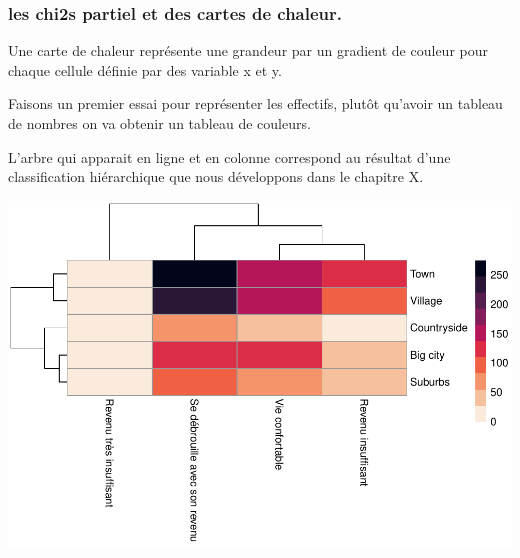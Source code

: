 \documentclass[
]{book}
\newenvironment{Shaded}{\begin{snugshade}}{\end{snugshade}}
\newcommand{\DataTypeTok}[1]{\textcolor[rgb]{0.13,0.29,0.53}{#1}}
\newcommand{\DecValTok}[1]{\textcolor[rgb]{0.00,0.00,0.81}{#1}}
\newcommand{\KeywordTok}[1]{\textcolor[rgb]{0.13,0.29,0.53}{\textbf{#1}}}
\newcommand{\NormalTok}[1]{#1}
\newcommand{\OperatorTok}[1]{\textcolor[rgb]{0.81,0.36,0.00}{\textbf{#1}}}
\newcommand{\StringTok}[1]{\textcolor[rgb]{0.31,0.60,0.02}{#1}}
\begin{document}
\hypertarget{les-chi2s-partiel-et-des-cartes-de-chaleur.}{%
\subsubsection{les chi2s partiel et des cartes de chaleur.}\label{les-chi2s-partiel-et-des-cartes-de-chaleur.}}

Une carte de chaleur représente une grandeur par un gradient de couleur pour chaque cellule définie par des variable x et y.

Faisons un premier essai pour représenter les effectifs, plutôt qu'avoir un tableau de nombres on va obtenir un tableau de couleurs.

L'arbre qui apparait en ligne et en colonne correspond au résultat d'une classification hiérarchique que nous développons dans le chapitre X.

\begin{Shaded}
\end{Shaded}

\includegraphics{bookdown-demo_files/figure-latex/0429-1.pdf}
\end{document}
